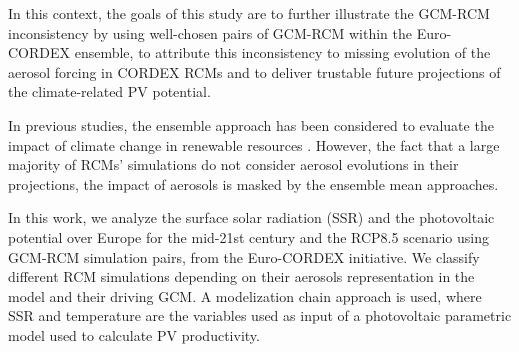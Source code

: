 




 In this context, the goals of this study are to further illustrate the GCM-RCM inconsistency by using well-chosen pairs of GCM-RCM within the Euro-CORDEX ensemble, to attribute this inconsistency to missing evolution of the aerosol forcing in CORDEX RCMs and to deliver trustable future projections of the climate-related PV potential.

In previous studies, the ensemble approach has been considered to evaluate the impact of climate change in renewable resources \cite*{Jerez2015, Tobin2018, Gil2019, Jerez2019}. However, the fact that a large majority of RCMs' simulations do not consider aerosol evolutions in their projections, the impact of aerosols is masked by the ensemble mean approaches.

In this work, we analyze the surface solar radiation (SSR) and the photovoltaic potential over Europe for the mid-21st century and the RCP8.5 scenario using GCM-RCM simulation pairs, from the Euro-CORDEX initiative. We classify different RCM simulations depending on their aerosols representation in the model and their driving GCM. A modelization chain approach is used, where SSR and temperature are the variables used as input of a photovoltaic parametric model used to calculate PV productivity.

   

